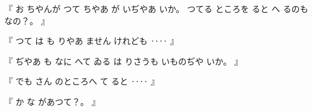 %
『
お
ちやんが
つて
ちやあ
が
いぢやあ
いか。
%
つてる
ところを
ると
へ
るのも
なの？。
』

%
『
つて
は
も
りやあ
ません
けれども
‥‥
』

%
『
ぢやあ
も
なに
へて
ゐる
は
りさうも
いものぢや
いか。
』

%
『
でも
さん
のところへ
て
ると
‥‥
』

%
『
か
な
があつて？。
』

